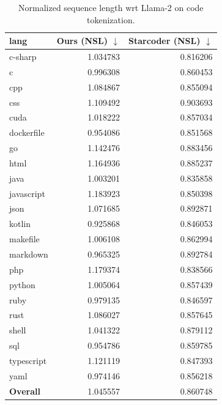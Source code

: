 \documentclass[11pt]{article}
\begin{document}
\begin{table}[]
    \centering
\begin{tabular}{lrr}
\toprule
     lang & Ours (NSL) $\downarrow$ &  Starcoder (NSL)  $\downarrow$\\
\midrule
    c-sharp &  1.034783 &   0.816206 \\
          c &  0.996308 &   0.860453 \\
        cpp &  1.084867 &   0.855094 \\
        css &  1.109492 &   0.903693 \\
       cuda &  1.018222 &   0.857034 \\
 dockerfile &  0.954086 &   0.851568 \\
         go &  1.142476 &   0.883456 \\
       html &  1.164936 &   0.885237 \\
       java &  1.003201 &   0.835858 \\
 javascript &  1.183923 &   0.850398 \\
       json &  1.071685 &   0.892871 \\
     kotlin &  0.925868 &   0.846053 \\
   makefile &  1.006108 &   0.862994 \\
   markdown &  0.965325 &   0.892784 \\
        php &  1.179374 &   0.838566 \\
     python &  1.005064 &   0.857439 \\
       ruby &  0.979135 &   0.846597 \\
       rust &  1.086027 &   0.857645 \\
      shell &  1.041322 &   0.879112 \\
        sql &  0.954786 &   0.859785 \\
 typescript &  1.121119 &   0.847393 \\
       yaml &  0.974146 &   0.856218 \\

\textbf{Overall} & 1.045557 & 0.860748 \\
\bottomrule
\end{tabular}
    \caption{Normalized sequence length wrt Llama-2 on code tokenization.}
\label{tab:code_nsl}
\end{table}
\end{document}
